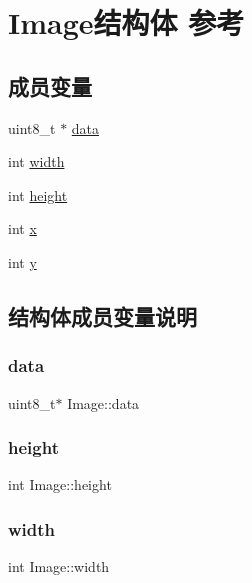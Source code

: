 \hypertarget{structImage}{}\section{Image结构体 参考}
\label{structImage}
\subsection*{成员变量}
\begin{DoxyCompactItemize}
\item 
uint8\+\_\+t $\ast$ \hyperlink{structImage_ac149fdf39be15025af7c3d8659f80999}{data}
\item 
int \hyperlink{structImage_ab8d12f635013c04159cd4d3d972bac88}{width}
\item 
int \hyperlink{structImage_a51df43db420c9c0b57536cb2dd36de5c}{height}
\item 
int \hyperlink{structImage_a7f8f4530212c93856e611030e46c82af}{x}
\item 
int \hyperlink{structImage_a9b03b7d8dd6f69cb5a444bdd0edd786e}{y}
\end{DoxyCompactItemize}


\subsection{结构体成员变量说明}
\mbox{\label{structImage_ac149fdf39be15025af7c3d8659f80999}} 
\subsubsection{\texorpdfstring{data}{data}}
{\footnotesize\ttfamily uint8\+\_\+t$\ast$ Image\+::data}

\mbox{\label{structImage_a51df43db420c9c0b57536cb2dd36de5c}} 
\subsubsection{\texorpdfstring{height}{height}}
{\footnotesize\ttfamily int Image\+::height}

\mbox{\label{structImage_ab8d12f635013c04159cd4d3d972bac88}} 
\subsubsection{\texorpdfstring{width}{width}}
{\footnotesize\ttfamily int Image\+::width}

